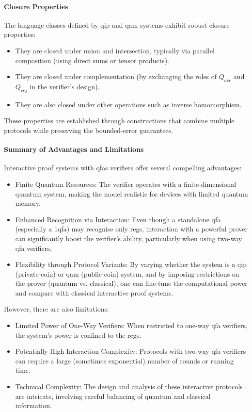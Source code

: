 \paragraph{Closure Properties}
The language classes defined by \gls{qip} and \gls{qam} systems exhibit robust closure properties:
\begin{itemize}
  \item They are closed under union and intersection, typically via parallel composition (using direct sums or tensor products).
  \item They are closed under complementation (by exchanging the roles of $Q_{acc}$ and $Q_{rej}$ in the verifier's design).
  \item They are also closed under other operations such as inverse homomorphism.
\end{itemize}
These properties are established through constructions that combine multiple protocols while preserving the bounded-error guarantees.

\paragraph{Summary of Advantages and Limitations}
Interactive proof systems with \glspl{qfa} verifiers offer several compelling advantages:
\begin{itemize}
  \item Finite Quantum Resources: The verifier operates with a finite-dimensional quantum system, making the model realistic for devices with limited quantum memory.
  \item Enhanced Recognition via Interaction: Even though a standalone qfa (especially a 1qfa) may recognise only \glspl{reg}, interaction with a powerful prover can significantly boost the verifier's ability, particularly when using two-way qfa verifiers.
  \item Flexibility through Protocol Variants: By varying whether the system is a \gls{qip} (private-coin) or \gls{qam} (public-coin) system, and by imposing restrictions on the prover (quantum vs. classical), one can fine-tune the computational power and compare with classical interactive proof systems.
\end{itemize}
However, there are also limitations:
\begin{itemize}
  \item {Limited Power of One-Way Verifiers:} When restricted to one-way qfa verifiers, the system's power is confined to the \glspl{reg}.
  \item {Potentially High Interaction Complexity:} Protocols with two-way qfa verifiers can require a large (sometimes exponential) number of rounds or running time.
  \item {Technical Complexity:} The design and analysis of these interactive protocols are intricate, involving careful balancing of quantum and classical information.
\end{itemize}

